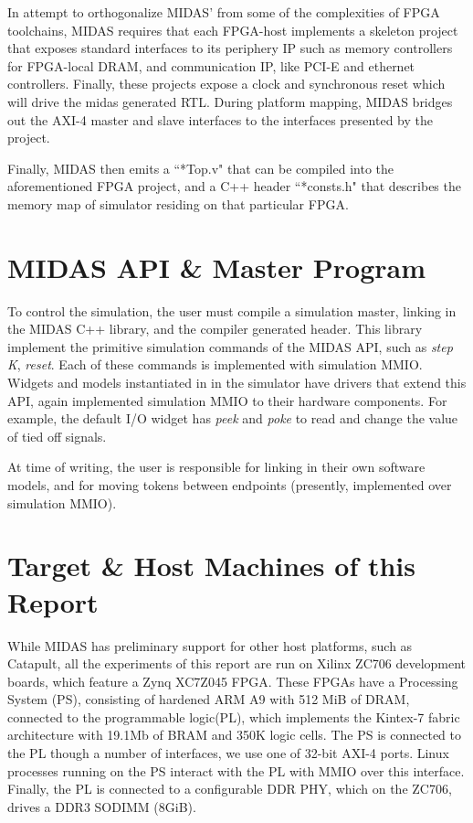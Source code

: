 In attempt to orthogonalize MIDAS' from some of the complexities of FPGA
toolchains, MIDAS requires that each FPGA-host implements a skeleton project
that exposes standard interfaces to its periphery IP such as  memory
controllers for FPGA-local DRAM, and communication IP, like PCI-E and ethernet
controllers. Finally, these projects expose a clock and synchronous reset which
will drive the midas generated RTL.  During platform mapping, MIDAS bridges out
the AXI-4 master and slave interfaces to the interfaces presented by the
project.

Finally, MIDAS then emits a ``*Top.v" that can be compiled into the
aforementioned FPGA project, and a C++ header ``*consts.h" that describes the
memory map of simulator residing on that particular FPGA.

\section{MIDAS API \& Master Program}

To control the simulation, the user must compile a simulation master, linking
in the MIDAS C++ library, and the compiler generated header. This library
implement the primitive simulation commands of the MIDAS API, such as
\emph{step K}, \emph{reset}. Each of these commands is implemented with
simulation MMIO.  Widgets and models instantiated in in the simulator have
drivers that extend this API, again implemented simulation MMIO to their
hardware components. For example, the default I/O widget has \emph{peek} and
\emph{poke} to read and change the value of tied off signals.

At time of writing, the user is responsible for linking in their own software
models, and for moving tokens between endpoints (presently, implemented over
simulation MMIO).

\section{Target \& Host Machines of this Report}

While MIDAS has preliminary support for other host platforms, such as Catapult,
all the experiments of this report are run on Xilinx ZC706 development boards,
which feature a Zynq XC7Z045 FPGA. These FPGAs have a Processing System (PS),
consisting of hardened ARM A9 with 512 MiB of DRAM, connected to the
programmable logic(PL), which implements the Kintex-7 fabric architecture with
19.1Mb of BRAM and 350K logic cells. The PS is connected to the PL though a
number of interfaces, we use one of 32-bit AXI-4 ports. Linux processes
running on the PS interact with the PL with MMIO over this interface.  Finally,
the PL is connected to a configurable DDR PHY, which on the ZC706, drives a
DDR3 SODIMM (8GiB).

